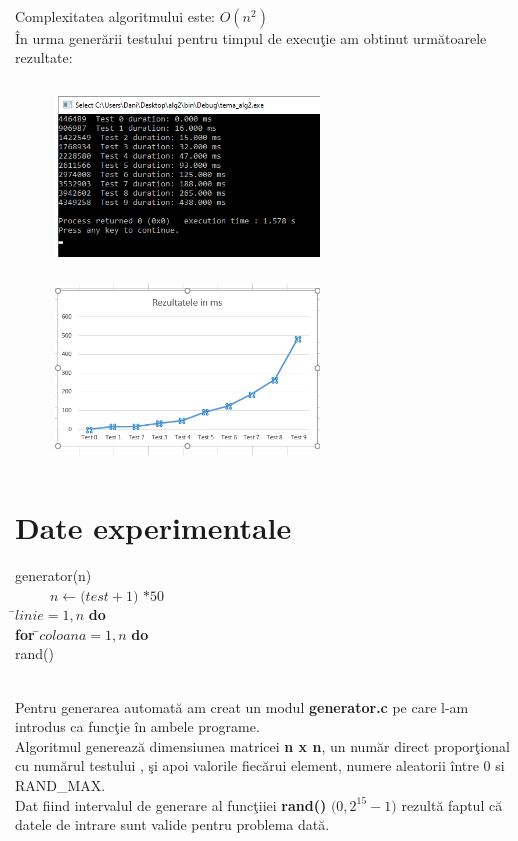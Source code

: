 \documentclass{article}
\begin{document}
\\Complexitatea algoritmului este: $O(n^2)$ 
\\\^{I}n urma gener\u{a}rii testului pentru timpul de execu\c{t}ie am obtinut urm\u{a}toarele rezultate:
\begin{figure}[h]
\includegraphics[width=7cm,height=5cm]{Figura2}
\includegraphics[width=7cm,height=5cm]{Grafic2}
\end{figure}

\section{Date experimentale}

\begin{center}
\begin{tabbing}
generator(n) \\
\indent \ \ \ \ \    $n \leftarrow \big(test+1)$ $*50$\\
 \=$linie = 1,n $ {\bf do}\\
\indent \> {\bf for} \=$coloana = 1,n $ {\bf do} \\
\indent \>\> rand()
\end{tabbing}
\end{center}
\\ Pentru generarea automat\u{a} am creat un modul \textbf{generator.c} pe care l-am introdus ca func\c{t}ie \^{i}n ambele programe.
\\Algoritmul genereaz\u{a}  dimensiunea matricei \textbf{n x n}, un num\u{a}r direct propor\c{t}ional cu num\u{a}rul testului
, \c{s}i apoi valorile fiec\u{a}rui element, numere aleatorii \^{i}ntre 0 si RAND\_MAX.
\\Dat fiind intervalul de generare al func\c{t}iiei {\bf rand()} $\big(0,2^{15}-1\big)$ rezult\u{a} faptul c\u{a}
datele de intrare sunt valide pentru problema dat\u{a}.
\end{document}
